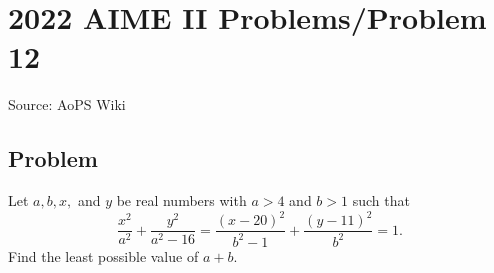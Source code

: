 \documentclass[12pt]{article}
\begin{document}
\section*{{2022 AIME II Problems/Problem 12}}
Source: AoPS Wiki

\subsection*{Problem}
Let $a, b, x,$ and $y$ be real numbers with $a>4$ and $b>1$ such that \[\frac{x^2}{a^2}+\frac{y^2}{a^2-16}=\frac{(x-20)^2}{b^2-1}+\frac{(y-11)^2}{b^2}=1.\] Find the least possible value of $a+b.$
\end{document}
